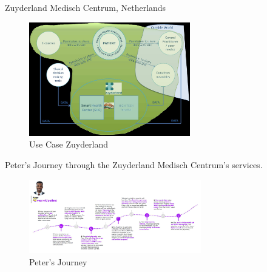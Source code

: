 
Zuyderland Medisch Centrum, Netherlands


\begin{figure}[ht!]
    \centering
    \includegraphics[width=70mm]{images/UseCaseZuyderland.jpg}
    \caption{Use Case Zuyderland}
    \label{fig:usecasezuyderland}
\end{figure}

Peter's Journey through the Zuyderland Medisch Centrum's services.

\begin{figure}
    \centering
    \includegraphics[width=75mm]{images/ZMC-Case.jpg}
    \caption{Peter's Journey}
    \label{fig:usecasezuyderland2}
\end{figure}

